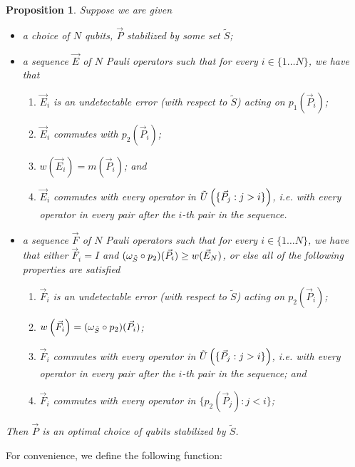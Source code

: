 \documentclass[twocolumn,showpacs,preprintnumbers,amsmath,amssymb,nofootinbib,pra,floatfix]{revtex4-1}
\newtheorem{proposition}{Proposition}
\newcommand{\lst}{\vec}
\newcommand{\set}{\tilde}
\begin{document}
\begin{proposition}
\label{proposition-optimality-condition}
Suppose we are given
\begin{itemize}
\item a choice of $N$ qubits, $\lst P$ stabilized by some set $\set S$;
\item a sequence $\lst E$ of $N$ Pauli operators such that for every $i\in\{1\dots N\}$, we have that
\begin{enumerate}
\item $\lst E_i$ is an undetectable error (with respect to $\set S$) acting on $p_1(\lst P_i)$;
\item $\lst E_i$ commutes with $p_2(\lst P_i)$;
\item $w(\lst E_i)=m(\lst P_i)$; and
\item $\lst E_i$ commutes with every operator in $\set U\paren{\{\lst P_j:j>i\}}$, i.e. with every operator in every pair after the $i$-th pair in the sequence.
\end{enumerate}
\item a sequence $\lst F$ of $N$ Pauli operators such that for every $i\in\{1\dots N\}$, we have that either $\lst F_i=I$ and $(\om_{\set S} \circ p_2)(\lst P_i) \ge w(\lst E_N)$, or else all of the following properties are satisfied
\begin{enumerate}
\item $\lst F_i$ is an undetectable error (with respect to $\set S$) acting on $p_2(\lst P_i)$;
\item $w\paren{\lst F_i}=(\om_{\set S} \circ p_2)(\lst P_i)$;
\item $\lst F_i$ commutes with every operator in $\set U\paren{\{\lst P_j:j>i\}}$, i.e. with every operator in every pair after the $i$-th pair in the sequence; and
\item $\lst F_i$ commutes with every operator in $\{p_2(\lst P_j): j<i\}$;
\end{enumerate}
\end{itemize}
Then $\lst P$ is an \emph{optimal choice of qubits stabilized by} $\set S$.
\end{proposition}
For convenience, we define the following function:
\end{document}
